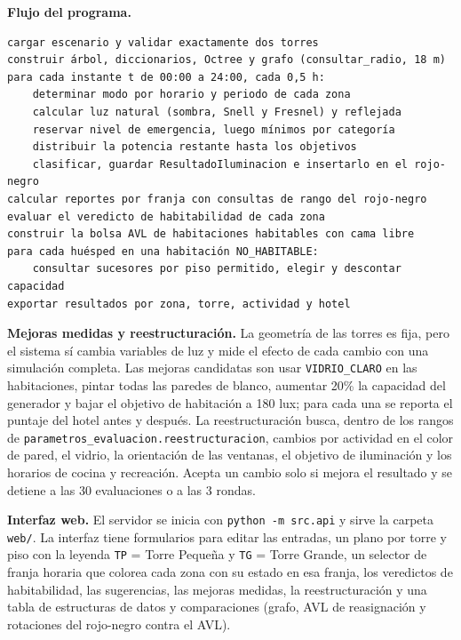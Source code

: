 \documentclass[12pt,a4paper]{article}
\newcommand{\clase}[1]{\texttt{#1}}
\newcommand{\codigo}[1]{\texttt{#1}}
\begin{document}
\textbf{Flujo del programa.}
\begin{verbatim}
cargar escenario y validar exactamente dos torres
construir árbol, diccionarios, Octree y grafo (consultar_radio, 18 m)
para cada instante t de 00:00 a 24:00, cada 0,5 h:
    determinar modo por horario y periodo de cada zona
    calcular luz natural (sombra, Snell y Fresnel) y reflejada
    reservar nivel de emergencia, luego mínimos por categoría
    distribuir la potencia restante hasta los objetivos
    clasificar, guardar ResultadoIluminacion e insertarlo en el rojo-negro
calcular reportes por franja con consultas de rango del rojo-negro
evaluar el veredicto de habitabilidad de cada zona
construir la bolsa AVL de habitaciones habitables con cama libre
para cada huésped en una habitación NO_HABITABLE:
    consultar sucesores por piso permitido, elegir y descontar capacidad
exportar resultados por zona, torre, actividad y hotel
\end{verbatim}

\textbf{Mejoras medidas y reestructuración.} La geometría de las torres es fija, pero el sistema sí cambia variables de luz y mide el efecto de cada cambio con una simulación completa. Las mejoras candidatas son usar \clase{VIDRIO\_CLARO} en las habitaciones, pintar todas las paredes de blanco, aumentar 20\% la capacidad del generador y bajar el objetivo de habitación a 180 lux; para cada una se reporta el puntaje del hotel antes y después. La reestructuración busca, dentro de los rangos de \codigo{parametros\_evaluacion.reestructuracion}, cambios por actividad en el color de pared, el vidrio, la orientación de las ventanas, el objetivo de iluminación y los horarios de cocina y recreación. Acepta un cambio solo si mejora el resultado y se detiene a las 30 evaluaciones o a las 3 rondas.

\textbf{Interfaz web.} El servidor se inicia con \codigo{python -m src.api} y sirve la carpeta \codigo{web/}. La interfaz tiene formularios para editar las entradas, un plano por torre y piso con la leyenda \codigo{TP} = Torre Pequeña y \codigo{TG} = Torre Grande, un selector de franja horaria que colorea cada zona con su estado en esa franja, los veredictos de habitabilidad, las sugerencias, las mejoras medidas, la reestructuración y una tabla de estructuras de datos y comparaciones (grafo, AVL de reasignación y rotaciones del rojo-negro contra el AVL).
\end{document}
